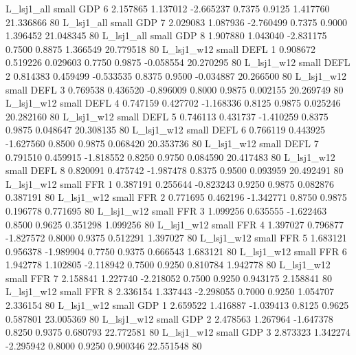    L_lsj1_all      small      GDP                 6 2.157865 1.137012 -2.665237 0.7375 0.9125  1.417760   21.336866 80
   L_lsj1_all      small      GDP                 7 2.029083 1.087936 -2.760499 0.7375 0.9000  1.396452   21.048345 80
   L_lsj1_all      small      GDP                 8 1.907880 1.043040 -2.831175 0.7500 0.8875  1.366549   20.779518 80
   L_lsj1_w12      small     DEFL                 1 0.908672 0.519226  0.029603 0.7750 0.9875 -0.058554   20.270295 80
   L_lsj1_w12      small     DEFL                 2 0.814383 0.459499 -0.533535 0.8375 0.9500 -0.034887   20.266500 80
   L_lsj1_w12      small     DEFL                 3 0.769538 0.436520 -0.896009 0.8000 0.9875  0.002155   20.269749 80
   L_lsj1_w12      small     DEFL                 4 0.747159 0.427702 -1.168336 0.8125 0.9875  0.025246   20.282160 80
   L_lsj1_w12      small     DEFL                 5 0.746113 0.431737 -1.410259 0.8375 0.9875  0.048647   20.308135 80
   L_lsj1_w12      small     DEFL                 6 0.766119 0.443925 -1.627560 0.8500 0.9875  0.068420   20.353736 80
   L_lsj1_w12      small     DEFL                 7 0.791510 0.459915 -1.818552 0.8250 0.9750  0.084590   20.417483 80
   L_lsj1_w12      small     DEFL                 8 0.820091 0.475742 -1.987478 0.8375 0.9500  0.093959   20.492491 80
   L_lsj1_w12      small      FFR                 1 0.387191 0.255644 -0.823243 0.9250 0.9875  0.082876    0.387191 80
   L_lsj1_w12      small      FFR                 2 0.771695 0.462196 -1.342771 0.8750 0.9875  0.196778    0.771695 80
   L_lsj1_w12      small      FFR                 3 1.099256 0.635555 -1.622463 0.8500 0.9625  0.351298    1.099256 80
   L_lsj1_w12      small      FFR                 4 1.397027 0.796877 -1.827572 0.8000 0.9375  0.512291    1.397027 80
   L_lsj1_w12      small      FFR                 5 1.683121 0.956378 -1.989904 0.7750 0.9375  0.666543    1.683121 80
   L_lsj1_w12      small      FFR                 6 1.942778 1.102805 -2.118942 0.7500 0.9250  0.810784    1.942778 80
   L_lsj1_w12      small      FFR                 7 2.158841 1.227740 -2.218052 0.7500 0.9250  0.943175    2.158841 80
   L_lsj1_w12      small      FFR                 8 2.336154 1.337443 -2.298055 0.7000 0.9250  1.054707    2.336154 80
   L_lsj1_w12      small      GDP                 1 2.659522 1.416887 -1.039413 0.8125 0.9625  0.587801   23.005369 80
   L_lsj1_w12      small      GDP                 2 2.478563 1.267964 -1.647378 0.8250 0.9375  0.680793   22.772581 80
   L_lsj1_w12      small      GDP                 3 2.873323 1.342274 -2.295942 0.8000 0.9250  0.900346   22.551548 80
